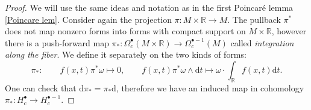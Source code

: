 \documentclass[english,letterpaper]{article}%
\numberwithin{equation}{section}
\numberwithin{figure}{section}
\numberwithin{table}{section}
\theoremstyle{definition}
\theoremstyle{definition}
\theoremstyle{definition}
\theoremstyle{plain}
\theoremstyle{plain}
\theoremstyle{plain}
\theoremstyle{plain}
\theoremstyle{remark}
\theoremstyle{remark}
\newcommand{\bbR}{\mathbb{R}}
\newcommand{\dd}{{\mathrm{d}}}
\begin{document}
\begin{proof}
    We will use the same ideas and notation as in the first Poincar\'e lemma \ref{Poincare lem}. Consider again the projection $\pi:M\times \bbR\to M$. The pullback $\pi^\ast$ does not map nonzero forms into forms with compact support on $M\times\bbR$, however there is a push-forward map $\pi_\ast:\Omega_c^\bullet(M\times\bbR)\to \Omega_c^{\bullet-1}(M)$ called \emph{integration along the fiber}. We define it separately on the two kinds of forms:
    \begin{equation}
        \pi_\ast: \quad\quad f(x,t)\pi^\ast\omega\mapsto  0,\quad\quad f(x,t)\pi^\ast \omega \wedge \dd t\mapsto  \omega\cdot\int_\bbR f(x,t)\dd t. 
    \end{equation}
    One can check that $\dd\pi_\ast=\pi_\ast \dd$, therefore we have an induced map in cohomology $\pi_\ast:H_c^\bullet\to H_c^{\bullet-1}$.
    

\end{proof}
\end{document}
